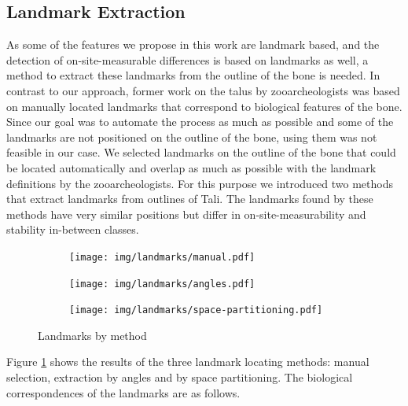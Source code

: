 \documentclass[pdftex,12pt,a4paper]{report}
\begin{document}
\subsection{Landmark Extraction}
\label{sub:landmarks}

As some of the features we propose in this work are landmark based, and the detection of on-site-measurable differences
is based on landmarks as well, a method to extract these landmarks from the outline of the bone is needed. In contrast to
our approach, former work on the talus by zooarcheologists was based on manually located landmarks that correspond to
biological features of the bone. Since our goal was to automate the process as much as possible and some of the landmarks
are not positioned on the outline of the bone, using them was not feasible in our case. We selected landmarks on the outline
of the bone that could be located automatically and overlap as much as possible with the landmark definitions by the
zooarcheologists. For this purpose we introduced two methods that extract landmarks from outlines of Tali. The landmarks
found by these methods have very similar positions but differ in on-site-measurability and stability in-between classes.

\begin{figure}
	\centering
	\begin{subfigure}[b]{0.3\textwidth}
		\centering
		\texttt{[image: img/landmarks/manual.pdf]}
	\end{subfigure}
	\begin{subfigure}[b]{0.3\textwidth}
		\centering
		\texttt{[image: img/landmarks/angles.pdf]}
	\end{subfigure}
	\begin{subfigure}[b]{0.3\textwidth}
		\centering
		\texttt{[image: img/landmarks/space-partitioning.pdf]}
	\end{subfigure}
	\caption{Landmarks by method}
	\label{fig:landmark-methods}
\end{figure}

Figure \ref{fig:landmark-methods} shows the results of the three landmark locating methods: manual selection, extraction by angles and
by space partitioning. The biological correspondences of the landmarks are as follows.
\end{document}
